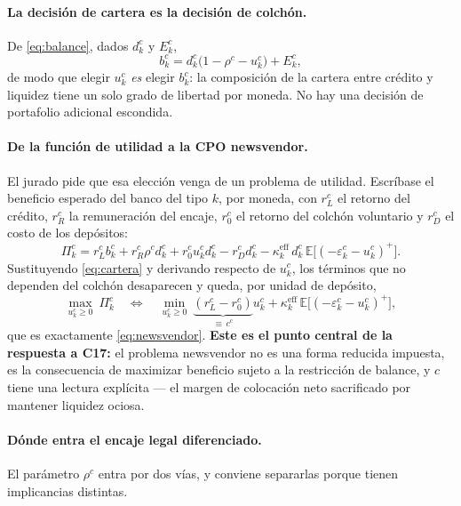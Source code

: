 \documentclass[11pt]{article}
\newcommand{\E}{\mathbb{E}}
\newcommand{\keff}{\kappa^{\mathrm{eff}}}
\theoremstyle{definition}
\begin{document}
\paragraph{La decisi\'on de cartera es la decisi\'on de colch\'on.} De
\eqref{eq:balance}, dados $d^c_k$ y $E^c_k$,
\begin{equation}
b^c_k = d^c_k\big(1-\rho^c-u^c_k\big)+E^c_k,
\label{eq:cartera}
\end{equation}
de modo que elegir $u^c_k$ \emph{es} elegir $b^c_k$: la composici\'on de la cartera
entre cr\'edito y liquidez tiene un solo grado de libertad por moneda. No hay una
decisi\'on de portafolio adicional escondida.

\paragraph{De la funci\'on de utilidad a la CPO newsvendor.} El jurado pide que
esa elecci\'on venga de un problema de utilidad. Escr\'ibase el beneficio esperado
del banco del tipo $k$, por moneda, con $r^c_L$ el retorno del cr\'edito, $r^c_R$
la remuneraci\'on del encaje, $r^c_0$ el retorno del colch\'on voluntario y
$r^c_D$ el costo de los dep\'ositos:
\begin{equation}
\Pi^c_k=r^c_L b^c_k+r^c_R\rho^c d^c_k+r^c_0 u^c_k d^c_k-r^c_D d^c_k
-\keff_k\,d^c_k\,\E\big[(-\varepsilon^c_k-u^c_k)^+\big].
\label{eq:utilidad}
\end{equation}
Sustituyendo \eqref{eq:cartera} y derivando respecto de $u^c_k$, los t\'erminos
que no dependen del colch\'on desaparecen y queda, por unidad de dep\'osito,
\begin{equation}
\max_{u^c_k\ge0}\ \Pi^c_k
\quad\Longleftrightarrow\quad
\min_{u^c_k\ge0}\ \underbrace{(r^c_L-r^c_0)}_{\textstyle \equiv\, c^c}u^c_k
+\keff_k\,\E\big[(-\varepsilon^c_k-u^c_k)^+\big],
\label{eq:equivalencia}
\end{equation}
que es exactamente \eqref{eq:newsvendor}. \textbf{Este es el punto central de la
respuesta a C17:} el problema newsvendor no es una forma reducida impuesta, es
la consecuencia de maximizar beneficio sujeto a la restricci\'on de balance, y
$c$ tiene una lectura expl\'icita --- el margen de colocaci\'on neto sacrificado
por mantener liquidez ociosa.

\paragraph{D\'onde entra el encaje legal diferenciado.} El par\'ametro $\rho^c$
entra por dos v\'ias, y conviene separarlas porque tienen implicancias distintas.
\end{document}

